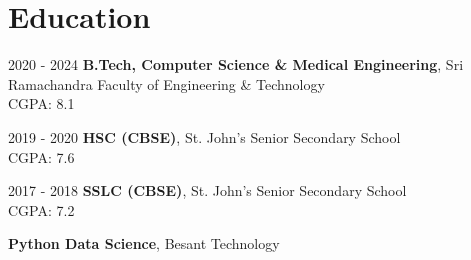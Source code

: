 \section{Education}
\begin{twocolentry}{
    2020 - 2024
}
    \textbf{B.Tech, Computer Science \& Medical Engineering}, Sri Ramachandra Faculty of Engineering \& Technology \\ CGPA: 8.1
\end{twocolentry}
\vspace{0.10 cm}
\begin{twocolentry}{
    2019 - 2020
}
    \textbf{HSC (CBSE)}, St. John's Senior Secondary School \\ CGPA: 7.6
\end{twocolentry}
\vspace{0.10 cm}
\begin{twocolentry}{
    2017 - 2018
}
    \textbf{SSLC (CBSE)}, St. John's Senior Secondary School \\ CGPA: 7.2
\end{twocolentry}
\vspace{0.10 cm}
\begin{onecolentry}
    \textbf{Python Data Science}, Besant Technology
\end{onecolentry}


